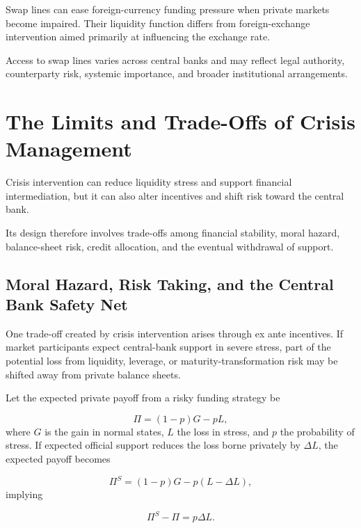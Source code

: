 Swap lines can ease foreign-currency funding pressure when private markets become impaired. Their liquidity function differs from foreign-exchange intervention aimed primarily at influencing the exchange rate.

Access to swap lines varies across central banks and may reflect legal authority, counterparty risk, systemic importance, and broader institutional arrangements.



\section{The Limits and Trade-Offs of Crisis Management}

Crisis intervention can reduce liquidity stress and support financial intermediation, but it can also alter incentives and shift risk toward the central bank.

Its design therefore involves trade-offs among financial stability, moral hazard, balance-sheet risk, credit allocation, and the eventual withdrawal of support.


\subsection{Moral Hazard, Risk Taking, and the Central Bank Safety Net}

One trade-off created by crisis intervention arises through ex ante incentives. If market participants expect central-bank support in severe stress, part of the potential loss from liquidity, leverage, or maturity-transformation risk may be shifted away from private balance sheets.

Let the expected private payoff from a risky funding strategy be

\begin{equation}
\Pi=(1-p)G-pL,
\label{eq:ch22-private-risk-payoff}
\end{equation}
where \(G\) is the gain in normal states, \(L\) the loss in stress, and \(p\) the probability of stress. If expected official support reduces the loss borne privately by \(\Delta L\), the expected payoff becomes

\begin{equation}
\Pi^{S}=(1-p)G-p(L-\Delta L),
\label{eq:ch22-supported-risk-payoff}
\end{equation}
implying

\begin{equation}
\Pi^{S}-\Pi=p\Delta L.
\label{eq:ch22-support-incentive}
\end{equation}


